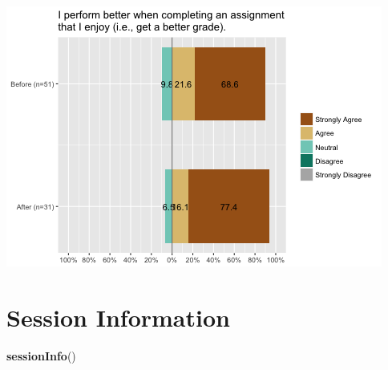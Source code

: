 \documentclass[]{article}
\newenvironment{Shaded}{\begin{snugshade}}{\end{snugshade}}
\newcommand{\KeywordTok}[1]{\textcolor[rgb]{0.13,0.29,0.53}{\textbf{{#1}}}}
\newcommand{\NormalTok}[1]{{#1}}
\begin{document}
\includegraphics{figures/metacognition-5.png}

\section{Session Information}\label{session-information}

\begin{Shaded}
\begin{Highlighting}[]
\KeywordTok{sessionInfo}\NormalTok{()}
\end{Highlighting}
\end{Shaded}
\end{document}
